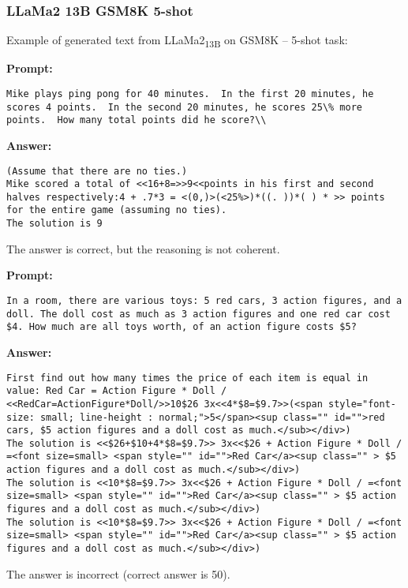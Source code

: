 \subsubsection*{LLaMa2 13B GSM8K 5-shot}
\noindent Example of generated text from LLaMa2\textsubscript{13B} on GSM8K -- 5-shot task:
\begin{displayquote}
	\textbf{Prompt:}
	\begin{Verbatim}[fontsize=\small,breaklines]
Mike plays ping pong for 40 minutes.  In the first 20 minutes, he scores 4 points.  In the second 20 minutes, he scores 25\% more points.  How many total points did he score?\\
	\end{Verbatim}
	\textbf{Answer:}
	\begin{Verbatim}[fontsize=\small,breaklines]
(Assume that there are no ties.)
Mike scored a total of <<16+8=>>9<<points in his first and second halves respectively:4 + .7*3 = <(0,)>(<25%>)*((. ))*( ) * >> points for the entire game (assuming no ties).
The solution is 9
	\end{Verbatim}
\end{displayquote}
The answer is correct, but the reasoning is not coherent.
\begin{displayquote}
	\textbf{Prompt:}
	\begin{Verbatim}[fontsize=\small,breaklines]
In a room, there are various toys: 5 red cars, 3 action figures, and a doll. The doll cost as much as 3 action figures and one red car cost $4. How much are all toys worth, of an action figure costs $5?
	\end{Verbatim}

	\textbf{Answer:}
	\begin{Verbatim}[fontsize=\small,breaklines]
First find out how many times the price of each item is equal in value: Red Car = Action Figure * Doll / <<RedCar=ActionFigure*Doll/>>10$26 3x<<4*$8=$9.7>>(<span style="font-size: small; line-height : normal;">5</span><sup class="" id="">red cars, $5 action figures and a doll cost as much.</sub></div>)
The solution is <<$26+$10+4*$8=$9.7>> 3x<<$26 + Action Figure * Doll / =<font size=small> <span style="" id="">Red Car</a><sup class="" > $5 action figures and a doll cost as much.</sub></div>)
The solution is <<10*$8=$9.7>> 3x<<$26 + Action Figure * Doll / =<font size=small> <span style="" id="">Red Car</a><sup class="" > $5 action figures and a doll cost as much.</sub></div>)
The solution is <<10*$8=$9.7>> 3x<<$26 + Action Figure * Doll / =<font size=small> <span style="" id="">Red Car</a><sup class="" > $5 action figures and a doll cost as much.</sub></div>)
	\end{Verbatim}
\end{displayquote}
The answer is incorrect (correct answer is 50).

